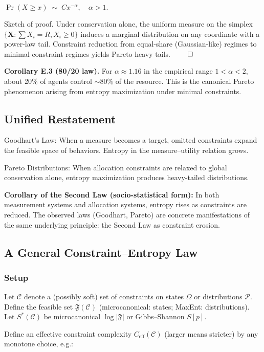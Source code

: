 \documentclass[12pt,a4paper]{article}
\begin{document}
$\Pr(X\ge x) \;\sim\; C x^{-\alpha}, \quad \alpha>1.$

Sketch of proof.
Under conservation alone, the uniform measure on the simplex $\{\mathbf{X} : \sum X_i = R, X_i \geq 0\}$ induces a marginal distribution on any coordinate with a power-law tail. Constraint reduction from equal-share (Gaussian-like) regimes to minimal-constraint regimes yields Pareto heavy tails. $\qed$

\textbf{Corollary E.3 (80/20 law).} For $\alpha \approx 1.16$ in the empirical range $1 < \alpha < 2$, about 20\% of agents control $\sim$80\% of the resource. This is the canonical Pareto phenomenon arising from entropy maximization under minimal constraints.

\subsection{Unified Restatement}

Goodhart’s Law: When a measure becomes a target, omitted constraints expand the feasible space of behaviors. Entropy in the measure–utility relation grows.

Pareto Distributions: When allocation constraints are relaxed to global conservation alone, entropy maximization produces heavy-tailed distributions.

\textbf{Corollary of the Second Law (socio-statistical form):} In both measurement systems and allocation systems, entropy rises as constraints are reduced. The observed laws (Goodhart, Pareto) are concrete manifestations of the same underlying principle: the Second Law as constraint erosion.

\subsection{A General Constraint–Entropy Law}

\subsubsection{Setup}

Let $\mathcal{C}$ denote a (possibly soft) set of constraints on states $\Omega$ or distributions $\mathcal{P}$.
Define the feasible set $\mathfrak{F}(\mathcal{C})$ (microcanonical: states; MaxEnt: distributions).
Let $S^*(\mathcal{C})$ be microcanonical $\log |\mathfrak{F}|$ or Gibbs–Shannon $S[p]$.

Define an effective constraint complexity $C_{\mathrm{eff}}(\mathcal{C})$ (larger means stricter) by any monotone choice, e.g.:
\end{document}
